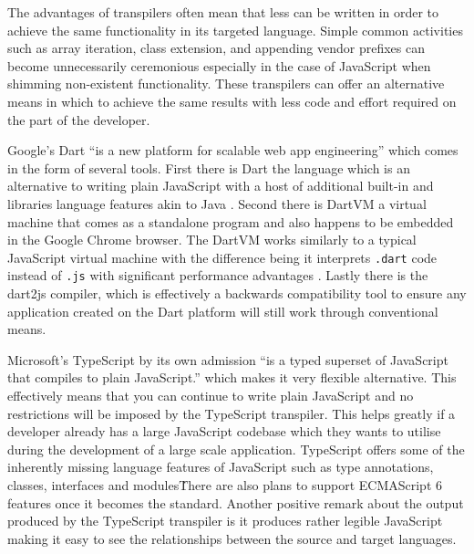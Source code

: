 \documentclass[final]{cmpreport}
\begin{document}

The advantages of transpilers often mean that less can be written in order to achieve the same functionality in its targeted language. Simple common activities such as array iteration, class extension, and appending vendor prefixes can become unnecessarily ceremonious especially in the case of JavaScript when shimming non-existent functionality. These transpilers can offer an alternative means in which to achieve the same results with less code and effort required on the part of the developer.

Google's Dart ``is a new platform for scalable web app engineering'' which comes in the form of several tools. First there is Dart the language which is an alternative to writing plain JavaScript with a host of additional built-in and libraries language features akin to Java \cite{Fortuna}. Second there is DartVM a virtual machine that comes as a standalone program and also happens to be embedded in the Google Chrome browser. The DartVM works similarly to a typical JavaScript virtual machine with the difference being it interprets \texttt{.dart} code instead of \texttt{.js} with significant performance advantages \cite{Schneider}. Lastly there is the dart2js compiler, which is effectively a backwards compatibility tool to ensure any application created on the Dart platform will still work through conventional means.

Microsoft's TypeScript by its own admission ``is a typed superset of JavaScript that compiles to plain JavaScript.'' which makes it very flexible alternative. This effectively means that you can continue to write plain JavaScript and no restrictions will be imposed by the TypeScript transpiler. This helps greatly if a developer already has a large JavaScript codebase which they wants to utilise during the development of a large scale application. TypeScript offers some of the inherently missing language features of JavaScript such as type annotations, classes, interfaces and modules\. There are also plans to support ECMAScript 6 features once it becomes the standard. Another positive remark about the output produced by the TypeScript transpiler is it produces rather legible JavaScript making it easy to see the relationships between the source and target languages.
\end{document}
